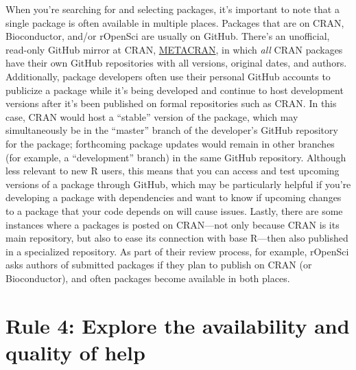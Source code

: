 \documentclass[10pt,letterpaper]{article}
\begin{document}
When you're searching for and selecting packages, it's important to note
that a single package is often available in multiple places. Packages
that are on CRAN, Bioconductor, and/or rOpenSci are usually on GitHub.
There's an unofficial, read-only GitHub mirror at CRAN,
\href{https://github.com/cran}{METACRAN}, in which \emph{all} CRAN
packages have their own GitHub repositories with all versions, original
dates, and authors. Additionally, package developers often use their
personal GitHub accounts to publicize a package while it's being
developed and continue to host development versions after it's been
published on formal repositories such as CRAN. In this case, CRAN would
host a ``stable'' version of the package, which may simultaneously be in
the ``master'' branch of the developer's GitHub repository for the
package; forthcoming package updates would remain in other branches (for
example, a ``development'' branch) in the same GitHub repository.
Although less relevant to new R users, this means that you can access
and test upcoming versions of a package through GitHub, which may be
particularly helpful if you're developing a package with dependencies
and want to know if upcoming changes to a package that your code depends
on will cause issues. Lastly, there are some instances where a packages
is posted on CRAN---not only because CRAN is its main repository, but
also to ease its connection with base R---then also published in a
specialized repository. As part of their review process, for example,
rOpenSci asks authors of submitted packages if they plan to publish on
CRAN (or Bioconductor), and often packages become available in both
places.

\hypertarget{rule-4-explore-the-availability-and-quality-of-help}{%
\section{Rule 4: Explore the availability and quality of
help}\label{rule-4-explore-the-availability-and-quality-of-help}}
\end{document}
